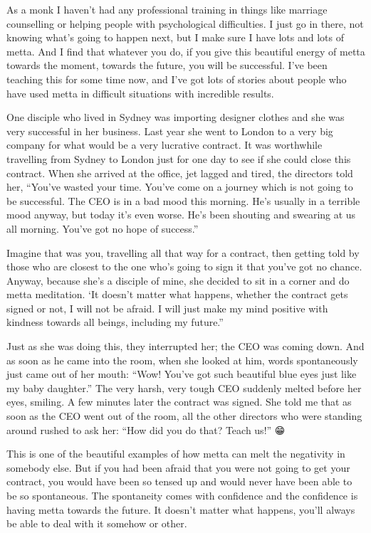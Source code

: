 \documentclass[12pt, openany]{book}
\begin{document}
As a monk I haven’t had any professional training in things like marriage counselling or helping people with psychological difficulties. I just go in there, not knowing what’s going to happen next, but I make sure I have lots and lots of metta. And I find that whatever you do, if you give this beautiful energy of metta towards the moment, towards the future, you will be successful. I’ve been teaching this for some time now, and I’ve got lots of stories about people who have used metta in difficult situations with incredible results. 

One disciple who lived in Sydney was importing designer clothes and she was very successful in her business. Last year she went to London to a very big company for what would be a very lucrative contract. It was worthwhile travelling from Sydney to London just for one day to see if she could close this contract. When she arrived at the office, jet lagged and tired, the directors told her, “You’ve wasted your time. You’ve come on a journey which is not going to be successful. The CEO is in a bad mood this morning. He’s usually in a terrible mood anyway, but today it’s even worse. He’s been shouting and swearing at us all morning. You’ve got no hope of success.” 

Imagine that was you, travelling all that way for a contract, then getting told by those who are closest to the one who’s going to sign it that you’ve got no chance. Anyway, because she’s a disciple of mine, she decided to sit in a corner and do metta meditation. ‘It doesn’t matter what happens, whether the contract gets signed or not, I will not be afraid. I will just make my mind positive with kindness towards all beings, including my future.” 

Just as she was doing this, they interrupted her; the CEO was coming down. And as soon as he came into the room, when she looked at him, words spontaneously just came out of her mouth: “Wow! You’ve got such beautiful blue eyes just like my baby daughter.” The very harsh, very tough CEO suddenly melted before her eyes, smiling. A few minutes later the contract was signed. She told me that as soon as the CEO went out of the room, all the other directors who were standing around rushed to ask her: “How did you do that? Teach us!” 😁 

This is one of the beautiful examples of how metta can melt the negativity in somebody else. But if you had been afraid that you were not going to get your contract, you would have been so tensed up and would never have been able to be so spontaneous. The spontaneity comes with confidence and the confidence is having metta towards the future. It doesn’t matter what happens, you’ll always be able to deal with it somehow or other. 
\end{document}
